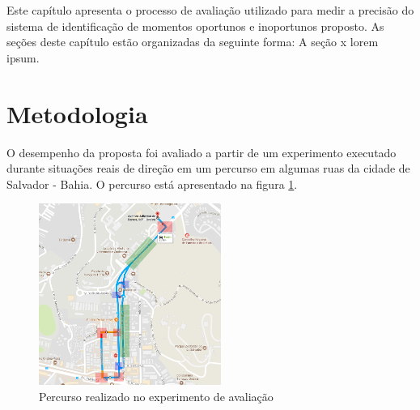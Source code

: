 \label{estudo-experimental}

Este capítulo apresenta o processo de avaliação utilizado para medir a precisão do
sistema de identificação de momentos oportunos e inoportunos proposto. As seções deste
capítulo estão organizadas da seguinte forma: A seção x lorem ipsum.

\section{Metodologia}
\label{metodologia}

O desempenho da proposta foi avaliado a partir de um experimento executado durante
situações reais de direção em um percurso em algumas ruas da cidade de Salvador -
Bahia. O percurso está apresentado na figura \ref{percurso}.

\begin{figure}[h]
\centering
\includegraphics[width=0.53\textwidth]{images/percurso.png}
\caption{Percurso realizado no experimento de avaliação}
\label{percurso}
\end{figure}
